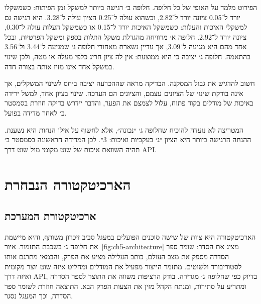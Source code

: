 הפירוט מלמד על האופי של כל חלופה. חלופה ב׳ רגישה ביותר למשקל זמן הפיתוח: כשמשקלו יורד ל־\textenglish{0.05} ציונה יורד ל־\textenglish{2.82}, וכשהוא עולה ל־\textenglish{0.25} הציון עולה ל־\textenglish{3.28}. היא רגישה גם למשקלי האיכות והעלות: כשמשקל האיכות יורד ל־\textenglish{0.15} או כשמשקל העלות עולה ל־\textenglish{0.30}, ציונה יורד ל־\textenglish{2.92}. חלופה א׳ מרוויחה מהגדלת משקל התלות בספק ומשקל הפרטיות, ובכל אחד מהם היא מגיעה ל־\textenglish{3.09}, אך עדיין נשארת מאחורי חלופה ג׳ שמגיעה ל־\textenglish{3.44} ול־\textenglish{3.56} בהתאמה. חלופה ג׳ יציבה כי היא ממוצעת: אין לה ציון חריג כלפי מעלה או מטה, ולכן שינוי במשקל אחד אינו מזיז אותה בצורה חדה.

חשוב להדגיש את גבול המסקנה. הבדיקה מראה שההכרעה יציבה ביחס לשינוי המשקלים, אך אינה בודקת שינוי של הציונים עצמם, והציונים הם הערכה. שינוי בציון אחד, למשל ירידה באיכות של מודלים בקוד פתוח, עלול לצמצם את הפער, והדבר יידרש בדיקה חוזרת בסמסטר ב׳ לאחר מדידה בפועל.

\begin{directornote}
המטריצה לא נועדה להוכיח שחלופה ג׳ ״נכונה״, אלא לחשוף על אילו הנחות היא נשענת. ההנחה הרגישה ביותר היא הציון ״ג׳ בעקביות ואיכות: 3״. לכן המדידה הראשונה בסמסטר ב׳ תהיה השוואת איכות של שוט מקומי מול שוט דרך \textenglish{API}.
\end{directornote}

\section{הארכיטקטורה הנבחרת}
\subsection{ארכיטקטורת המערכת}
הארכיטקטורה היא צוות של שישה סוכנים הפועלים במעגל סביב זיכרון משותף, והיא מיישמת את חלופה ג׳ בשכבת התזמור. איור~\ref{fig:ch5-architecture} מציג את הסדר: שומר ספר הסדרה מספק את מצב העולם, כותב העלילה מציע את הפרק, והבמאי מתרגם אותו לסטוריבורד ולשוטים. מתזמר הייצור מפעיל את המודלים ומחליט איזה שוט יוצר מקומית ואיזה דרך \textenglish{API}, בדיוק כפי שחלופה ג׳ מגדירה. בודק הרציפות משווה את התוצר לספר הסדרה ומתריע על סתירות, ומנתח הקהל מזין את הצעות הפרק הבא. התוצאה חוזרת לשומר ספר הסדרה, וכך המעגל נסגר.

